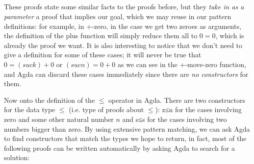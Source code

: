 {\begin{code}
\AgdaOperator{\AgdaPrimitive{+}}\AgdaSpace{}%
\<%
\\
\>[0]\AgdaSpace{}%
\AgdaSpace{}%
\AgdaSpace{}%
\AgdaSpace{}%
\AgdaSymbol{=}\AgdaSpace{}%
\<%
\\
\>[0]\AgdaSpace{}%
\AgdaSpace{}%
\AgdaSymbol{(}\AgdaSpace{}%
\AgdaSymbol{)}\AgdaSpace{}%
\AgdaSymbol{()}\<%
\\
\>[0]\AgdaSpace{}%
\AgdaSymbol{(}\AgdaSpace{}%
\AgdaSymbol{)}\AgdaSpace{}%
\AgdaSpace{}%
\AgdaSymbol{()}\<%
\\
\>[0]\AgdaSpace{}%
\AgdaSymbol{(}\AgdaSpace{}%
\AgdaSymbol{)}\AgdaSpace{}%
\AgdaSymbol{(}\AgdaSpace{}%
\AgdaSpace{}%
\AgdaDottedPattern{\AgdaOperator{\AgdaPrimitive{+}}}\AgdaSpace{}%
\AgdaDottedPattern{\AgdaSymbol{)}}\AgdaSymbol{)}\AgdaSpace{}%
\AgdaSpace{}%
\AgdaSymbol{=}\AgdaSpace{}%
\AgdaSpace{}%
\AgdaSpace{}%
\AgdaSymbol{(}\AgdaSpace{}%
\AgdaSpace{}%
\AgdaSymbol{(}\AgdaSpace{}%
\AgdaOperator{\AgdaPrimitive{+}}\AgdaSpace{}%
\AgdaSymbol{)}\AgdaSpace{}%
\AgdaSymbol{)}\<%
\end{code}

These proofs state some similar facts to the proofs before, but they \emph{take in as a parameter} a proof that implies our goal, which we may reuse in our pattern definitions: for example, in +-zero, in the case we get two zeroes as arguments, the definition of the plus function will simply reduce them all to $0 = 0$, which is already the proof we want. It is also interesting to notice that we don't need to give a definition for some of these cases; it will never be true that $0 = (suc k) + 0$ or $(suc n) = 0 + 0$ as we can see in the +-move-zero function, and Agda can discard these cases immediately since there are \emph{no constructors} for them.

Now onto the definition of the $\le$ operator in Agda. There are two constructors for the data type $\le$ (i.e. type of proofs about $\le$): z≤n for the cases involving zero and some other natural number $n$ and s≤s for the cases involving two numbers bigger than zero. By using extensive pattern matching, we can ask Agda to find constructors that match the types we hope to return, in fact, most of the following proofs can be written automatically by asking Agda to search for a solution:

}
